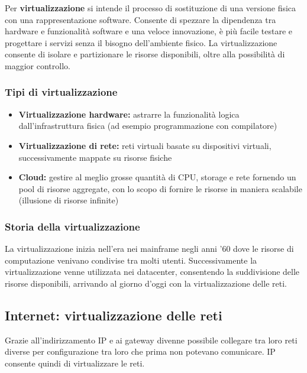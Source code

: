 \documentclass[
]{article}
\begin{document}
Per \textbf{virtualizzazione} si intende il processo di sostituzione di
una versione fisica con una rappresentazione software. Consente di
spezzare la dipendenza tra hardware e funzionalità software e una veloce
innovazione, è più facile testare e progettare i servizi senza il
bisogno dell'ambiente fisico. La virtualizzazione consente di isolare e
partizionare le risorse disponibili, oltre alla possibilità di maggior
controllo.

\hypertarget{header-n275}{%
\subsubsection{Tipi di virtualizzazione}\label{header-n275}}

\begin{itemize}
\item
  \textbf{Virtualizzazione hardware:} astrarre la funzionalità logica
  dall'infrastruttura fisica (ad esempio programmazione con compilatore)
\item
  \textbf{Virtualizzazione di rete: }reti virtuali basate su dispositivi
  virtuali, successivamente mappate su risorse fisiche
\item
  \textbf{Cloud: }gestire al meglio grosse quantità di CPU, storage e
  rete fornendo un pool di risorse aggregate, con lo scopo di fornire le
  risorse in maniera scalabile (illusione di risorse infinite)
\end{itemize}

\hypertarget{header-n283}{%
\subsubsection{Storia della virtualizzazione}\label{header-n283}}

La virtualizzazione inizia nell'era nei mainframe negli anni '60 dove le
risorse di computazione venivano condivise tra molti utenti.
Successivamente la virtualizzazione venne utilizzata nei datacenter,
consentendo la suddivisione delle risorse disponibili, arrivando al
giorno d'oggi con la virtualizzazione delle reti.

\hypertarget{header-n285}{%
\subsection{Internet: virtualizzazione delle reti}\label{header-n285}}

Grazie all'indirizzamento IP e ai gateway divenne possibile collegare
tra loro reti diverse per configurazione tra loro che prima non potevano
comunicare. IP consente quindi di virtualizzare le reti.
\end{document}
